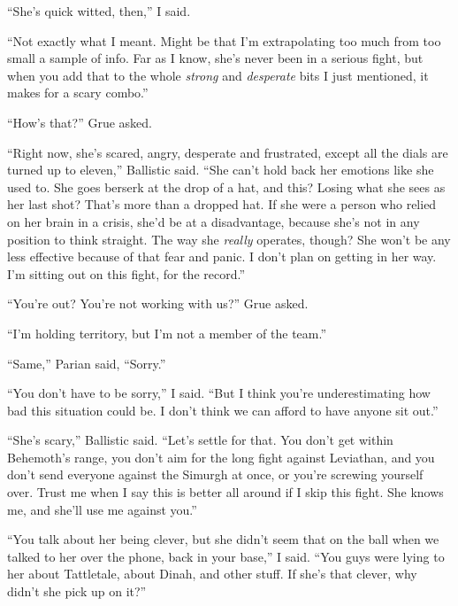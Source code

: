 ``She's quick witted, then,'' I said.



``Not exactly what I meant.  Might be that I'm extrapolating too much from too small a sample of info.  Far as I know, she's never been in a serious fight, but when you add that to the whole \emph{strong} and \emph{desperate} bits I just mentioned, it makes for a scary combo.''



``How's that?'' Grue asked.



``Right now, she's scared, angry, desperate and frustrated, except all the dials are turned up to eleven,'' Ballistic said.  ``She can't hold back her emotions like she used to.  She goes berserk at the drop of a hat, and this?  Losing what she sees as her last shot?  That's more than a dropped hat.  If she were a person who relied on her brain in a crisis, she'd be at a disadvantage, because she's not in any position to think straight.  The way she \emph{really} operates, though?  She won't be any less effective because of that fear and panic.  I don't plan on getting in her way.  I'm sitting out on this fight, for the record.''



``You're out?  You're not working with us?'' Grue asked.



``I'm holding territory, but I'm not a member of the team.''



``Same,'' Parian said, ``Sorry.''



``You don't have to be sorry,'' I said.  ``But I think you're underestimating how bad this situation could be.  I don't think we can afford to have anyone sit out.''



``She's scary,'' Ballistic said.  ``Let's settle for that.  You don't get within Behemoth's range, you don't aim for the long fight against Leviathan, and you don't send everyone against the Simurgh at once, or you're screwing yourself over.  Trust me when I say this is better all around if I skip this fight.  She knows me, and she'll use me against you.''



``You talk about her being clever, but she didn't seem that on the ball when we talked to her over the phone, back in your base,''  I said.  ``You guys were lying to her about Tattletale, about Dinah, and other stuff.  If she's that clever, why didn't she pick up on it?''



